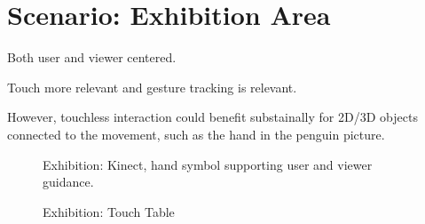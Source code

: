 \documentclass[review,journal]{vgtc}         %
\begin{document}
\section{Scenario: Exhibition Area}

Both user and viewer centered.

Touch more relevant and gesture tracking is relevant.

However, touchless interaction could benefit substainally for 2D/3D objects connected to the movement, such as the hand in the penguin picture.

\begin{figure}[htb]
	\centering
	\caption{Exhibition: Kinect, hand symbol supporting user and viewer guidance.}
	\label{img:exhibition_kinect}
\end{figure}

\begin{figure}[htb]
	\centering
	\caption{Exhibition: Touch Table}
	\label{img:exhibition_table}
\end{figure}
\end{document}
